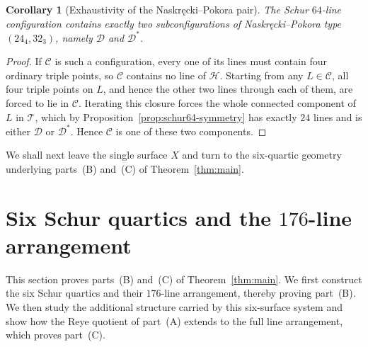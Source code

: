 \documentclass[10pt]{article}
\newtheorem{corollary}[proposition]{Corollary}
\begin{document}
\begin{corollary}[Exhaustivity of the Naskr\k{e}cki--Pokora pair]\label{cor:only-two-NP}
The Schur $64$-line configuration contains exactly two subconfigurations of Naskr\k{e}cki--Pokora type $(24_4,32_3)$, namely $\mathcal D$ and $\mathcal D^*$.
\end{corollary}

\begin{proof}
If $\mathcal C$ is such a configuration, every one of its lines must contain four ordinary triple points, so $\mathcal C$ contains no line of $\mathcal H$.  Starting from any $L\in\mathcal C$, all four triple points on $L$, and hence the other two lines through each of them, are forced to lie in $\mathcal C$.  Iterating this closure forces the whole connected component of $L$ in $\mathcal T$, which by Proposition~\ref{prop:schur64-symmetry} has exactly $24$ lines and is either $\mathcal D$ or $\mathcal D^*$.  Hence $\mathcal C$ is one of these two components.
\end{proof}

We shall next leave the single surface $X$ and turn to the six-quartic
geometry underlying parts~\textup{(B)} and~\textup{(C)} of
Theorem~\ref{thm:main}.

\section{Six Schur quartics and the $176$-line arrangement}
This section proves parts~\textup{(B)} and~\textup{(C)} of
Theorem~\ref{thm:main}.  We first construct the six Schur quartics and
their $176$-line arrangement, thereby proving part~\textup{(B)}.  We then
study the additional structure carried by this six-surface system and show
how the Reye quotient of part~\textup{(A)} extends to the full line
arrangement, which proves part~\textup{(C)}.
\end{document}

